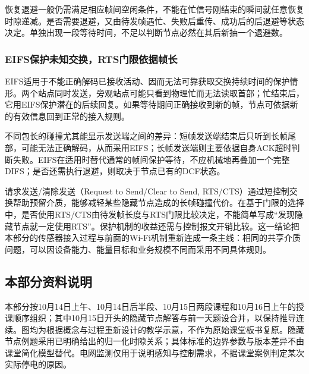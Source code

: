 恢复退避一般仍需满足相应帧间空闲条件，不能在忙信号刚结束的瞬间就任意恢复时隙递减。是否需要退避，又由待发帧遇忙、失败后重传、成功后的后退避等状态决定。单独出现一段等待时间，不足以判断节点必然在其后新抽一个退避数。

\subsubsection{EIFS保护未知交换，RTS门限依据帧长}

EIFS适用于不能正确解码已接收活动、因而无法可靠获取交换持续时间的保护情形。两个站点同时发送，旁观站点可能只看到物理忙而无法读取首部；忙结束后，它用EIFS保护潜在的后续回复。如果等待期间正确接收到新的帧，节点可依据新的有效信息回到正常的接入规则。

不同包长的碰撞尤其能显示发送端之间的差异：短帧发送端结束后只听到长帧尾部，可能无法正确解码，从而采用EIFS；长帧发送端则主要依据自身ACK超时判断失败。EIFS在适用时替代通常的帧间保护等待，不应机械地再叠加一个完整DIFS；是否还需执行退避，则取决于节点已有的DCF状态。

请求发送/清除发送（Request to Send/Clear to Send, RTS/CTS）通过短控制交换帮助预留介质，能够减轻某些隐藏节点造成的长帧碰撞代价。在基于门限的选择中，是否使用RTS/CTS由待发帧长度与RTS门限比较决定，不能简单写成“发现隐藏节点就一定使用RTS”。保护机制的收益还需与控制报文开销比较。这一结论把本部分的传感器接入过程与前面的Wi-Fi机制重新连成一条主线：相同的共享介质问题，可以因设备能力、能量目标和业务规模不同而采用不同具体规则。

\subsection*{本部分资料说明}
本部分按10月14日上午、10月14日后半段、10月15日两段课程和10月16日上午的授课顺序组织；其中10月15日开头的隐藏节点解答与前一天题设合并，以保持推导连续。图均为根据概念与过程重新设计的教学示意，不作为原始课堂板书复原。隐藏节点例题采用已明确给出的归一化时隙关系；具体标准的边界参数与版本差异不由课堂简化模型替代。电网监测仅用于说明感知与控制需求，不据课堂案例判定某次实际停电的原因。
